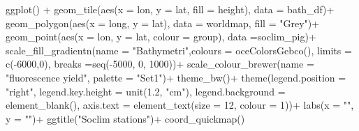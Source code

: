 \documentclass[
]{article}
\newenvironment{Shaded}{\begin{snugshade}}{\end{snugshade}}
\newcommand{\AttributeTok}[1]{\textcolor[rgb]{0.77,0.63,0.00}{#1}}
\newcommand{\DecValTok}[1]{\textcolor[rgb]{0.00,0.00,0.81}{#1}}
\newcommand{\FloatTok}[1]{\textcolor[rgb]{0.00,0.00,0.81}{#1}}
\newcommand{\FunctionTok}[1]{\textcolor[rgb]{0.00,0.00,0.00}{#1}}
\newcommand{\NormalTok}[1]{#1}
\newcommand{\SpecialCharTok}[1]{\textcolor[rgb]{0.00,0.00,0.00}{#1}}
\newcommand{\StringTok}[1]{\textcolor[rgb]{0.31,0.60,0.02}{#1}}
\begin{document}
\begin{Shaded}
\begin{Highlighting}[]
\FunctionTok{ggplot}\NormalTok{() }\SpecialCharTok{+}
  \FunctionTok{geom\_tile}\NormalTok{(}\FunctionTok{aes}\NormalTok{(}\AttributeTok{x =}\NormalTok{ lon, }\AttributeTok{y =}\NormalTok{ lat, }\AttributeTok{fill =}\NormalTok{ height), }\AttributeTok{data =}\NormalTok{ bath\_df)}\SpecialCharTok{+}
  \FunctionTok{geom\_polygon}\NormalTok{(}\FunctionTok{aes}\NormalTok{(}\AttributeTok{x =}\NormalTok{ long, }\AttributeTok{y =}\NormalTok{ lat), }\AttributeTok{data =}\NormalTok{ worldmap, }\AttributeTok{fill =} \StringTok{"Grey"}\NormalTok{)}\SpecialCharTok{+}
  \FunctionTok{geom\_point}\NormalTok{(}\FunctionTok{aes}\NormalTok{(}\AttributeTok{x =}\NormalTok{ lon, }\AttributeTok{y =}\NormalTok{ lat, }\AttributeTok{colour =}\NormalTok{ group), }\AttributeTok{data =}\NormalTok{soclim\_pig)}\SpecialCharTok{+}
  \FunctionTok{scale\_fill\_gradientn}\NormalTok{(}\AttributeTok{name =} \StringTok{"Bathymetri"}\NormalTok{,}\AttributeTok{colours =} \FunctionTok{oceColorsGebco}\NormalTok{(),}
                       \AttributeTok{limits =} \FunctionTok{c}\NormalTok{(}\SpecialCharTok{{-}}\DecValTok{6000}\NormalTok{,}\DecValTok{0}\NormalTok{), }\AttributeTok{breaks =}\FunctionTok{seq}\NormalTok{(}\SpecialCharTok{{-}}\DecValTok{5000}\NormalTok{, }\DecValTok{0}\NormalTok{, }\DecValTok{1000}\NormalTok{))}\SpecialCharTok{+}
  \FunctionTok{scale\_colour\_brewer}\NormalTok{(}\AttributeTok{name =} \StringTok{"fluorescence yield"}\NormalTok{, }\AttributeTok{palette =} \StringTok{"Set1"}\NormalTok{)}\SpecialCharTok{+}
  \FunctionTok{theme\_bw}\NormalTok{()}\SpecialCharTok{+}
  \FunctionTok{theme}\NormalTok{(}\AttributeTok{legend.position =} \StringTok{"right"}\NormalTok{,}
        \AttributeTok{legend.key.height =} \FunctionTok{unit}\NormalTok{(}\FloatTok{1.2}\NormalTok{, }\StringTok{"cm"}\NormalTok{), }
        \AttributeTok{legend.background =} \FunctionTok{element\_blank}\NormalTok{(),}
        \AttributeTok{axis.text =} \FunctionTok{element\_text}\NormalTok{(}\AttributeTok{size =} \DecValTok{12}\NormalTok{, }\AttributeTok{colour =} \DecValTok{1}\NormalTok{))}\SpecialCharTok{+}
  \FunctionTok{labs}\NormalTok{(}\AttributeTok{x =} \StringTok{""}\NormalTok{, }\AttributeTok{y =} \StringTok{""}\NormalTok{)}\SpecialCharTok{+}
  \FunctionTok{ggtitle}\NormalTok{(}\StringTok{"Soclim stations"}\NormalTok{)}\SpecialCharTok{+}
  \FunctionTok{coord\_quickmap}\NormalTok{()}
\end{Highlighting}
\end{Shaded}
\end{document}
